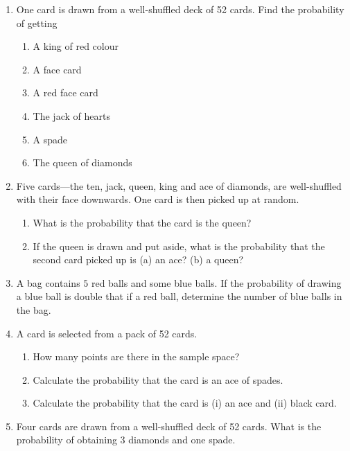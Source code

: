 \begin{enumerate}[label=\thesection.\arabic*,ref=\thesection.\theenumi]
	\item One card is drawn from a well-shuffled deck of 52 cards. Find the probability of getting
\begin{enumerate}
\item A king of red colour 
\item A face card 
\item A red face card
\item The jack of hearts
\item A spade
\item The queen of diamonds

\end{enumerate}
\solution
	\item Five cards—the ten, jack, queen, king and ace of diamonds, are well-shuffled with their face downwards. One card is then picked up at random.
\begin{enumerate}
\item
What is the probability that the card is the queen? 
\item
If the queen is drawn and put aside, what is the probability that the second card picked up is (a) an ace? (b) a queen?\\
\end{enumerate}
\solution
	\item A bag contains $5$ red balls and some blue balls. If the probability of drawing a blue ball is double that if a red ball, determine the number of blue balls in the bag. 
		\\
\solution
	\item A card is selected from a pack of 52 cards.
 \begin{enumerate}[label=(\alph*)] 
                 \item How many points are there in the sample space?
                 \item Calculate the probability that the card is an ace of spades.
                 \item Calculate the probability that the card is (i) an ace and (ii) black card.
 \end{enumerate}
\solution
\item Four cards are drawn from a well-shuffled deck of 52 cards. What is the probability of obtaining 3 diamonds and one spade.

\end{enumerate}
